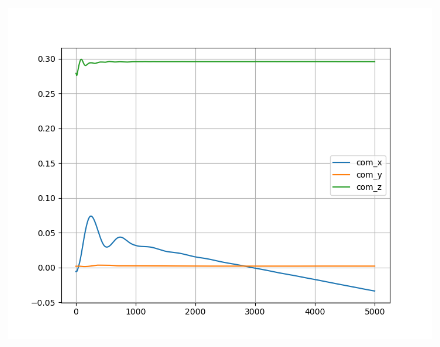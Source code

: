 \documentclass{beamer}
\begin{document}
\begin{frame}
\begin{columns}[onlytextwidth, T]
\begin{column}{.7\textwidth}
\begin{figure}
                \includegraphics[height=0.4\textheight]{../images/com.png}
            \end{figure}
        
        \end{column}
      \end{columns}
\end{frame}
\end{document}
